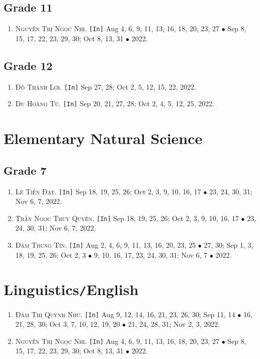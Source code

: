 \documentclass{article}
\numberwithin{equation}{section}
\begin{document}
\subsection{Grade 11}
\begin{enumerate}
	\item \textsc{Nguyễn Thị Ngọc Nhi.} \texttt{[In]} Aug 4, 6, 9, 11, 13, 16, 18, 20, 23, 27 $\bullet$ Sep 8, 15, 17, 22, 23, 29, 30; Oct 8, 13, 31 $\bullet$ 2022.
\end{enumerate}

\subsection{Grade 12}
\begin{enumerate}
	\item \textsc{Đỗ Thành Lợi.} \texttt{[In]} Sep 27, 28; Oct 2, 5, 12, 15, 22, 2022.
	\item \textsc{Du Hoàng Tú.} \texttt{[In]} Sep 20, 21, 27, 28; Oct 2, 4, 5, 12, 25, 2022.
\end{enumerate}


\section{Elementary Natural Science}

\subsection{Grade 7}
\begin{enumerate}
	\item \textsc{Lê Tiến Đạt.} \texttt{[In]} Sep 18, 19, 25, 26; Oct 2, 3, 9, 10, 16, 17 $\bullet$ 23, 24, 30, 31; Nov 6, 7, 2022.
	\item \textsc{Trần Ngọc Thúy Quyên.} \texttt{[In]} Sep 18, 19, 25, 26; Oct 2, 3, 9, 10, 16, 17 $\bullet$ 23, 24, 30, 31; Nov 6, 7, 2022.
	\item \textsc{Đàm Trung Tín.} \texttt{[In]} Aug 2, 4, 6, 9, 11, 13, 16, 20, 23, 25 $\bullet$ 27, 30; Sep 1, 3, 18, 19, 25, 26; Oct 2, 3 $\bullet$ 9, 10, 16, 17, 23, 24, 30, 31; Nov 6, 7 $\bullet$ 2022.
\end{enumerate}


\section{Linguistics\texttt{/}English}
\begin{enumerate}
	\item \textsc{Đàm Thị Quỳnh Như.} \texttt{[In]} Aug 9, 12, 14, 16, 21, 23, 26, 30; Sep 11, 14 $\bullet$ 16, 21, 28, 30; Oct 3, 7, 10, 12, 19, 20 $\bullet$ 21, 24, 28, 31; Nov 2, 3, 2022.
	\item \textsc{Nguyễn Thị Ngọc Nhi.} \texttt{[In]} Aug 4, 6, 9, 11, 13, 16, 18, 20, 23, 27 $\bullet$ Sep 8, 15, 17, 22, 23, 29, 30; Oct 8, 13, 31 $\bullet$ 2022.
\end{enumerate}


\printbibliography[heading=bibintoc]
	
\end{document}
